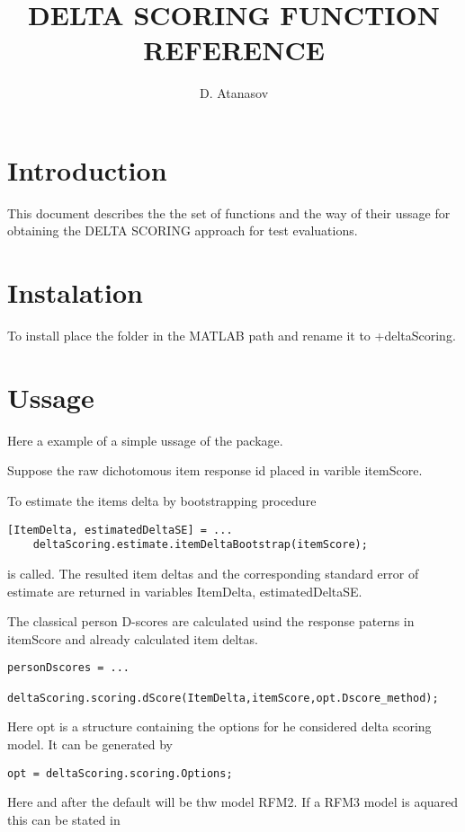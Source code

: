 \documentclass[12pt]{article}
\title{DELTA SCORING FUNCTION REFERENCE}
\author{D. Atanasov}
\begin{document}
\maketitle

\section{Introduction}
This document describes the the set of functions and the way of their ussage for obtaining the DELTA SCORING approach for test evaluations.

\section{Instalation}
To install place the folder in the MATLAB path and rename it to +deltaScoring.

\section{Ussage}
Here a example of a simple ussage of the package.

Suppose the raw dichotomous item response id placed in varible itemScore.

To estimate the items delta by bootstrapping procedure

\begin{lstlisting}[style=Matlab-bw]
[ItemDelta, estimatedDeltaSE] = ...
	deltaScoring.estimate.itemDeltaBootstrap(itemScore);
\end{lstlisting}

is called. The resulted item deltas and the corresponding standard error of estimate are returned in variables ItemDelta, estimatedDeltaSE.

The classical person D-scores are calculated usind the response paterns in itemScore and already calculated item deltas.

\begin{lstlisting}[style=Matlab-bw]
personDscores = ...
	deltaScoring.scoring.dScore(ItemDelta,itemScore,opt.Dscore_method);
\end{lstlisting}

Here opt is a structure containing the options for he considered delta scoring model. It can be generated by

\begin{lstlisting}[style=Matlab-bw]
opt = deltaScoring.scoring.Options;
\end{lstlisting}

Here and after the default will be thw model RFM2. If a RFM3 model is aquared this can be stated in 
\end{document}
